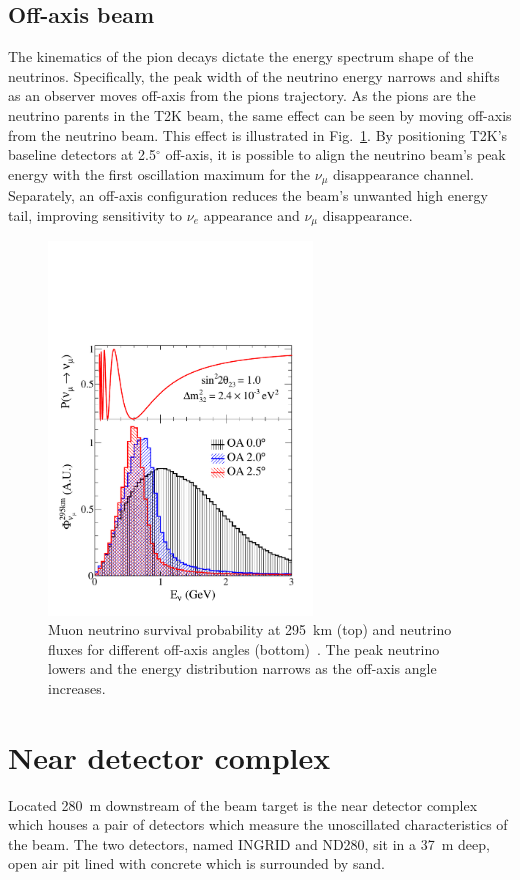 \subsection{Off-axis beam}
\label{subsec:OffAxisBeam}
The kinematics of the pion decays dictate the energy spectrum shape of the neutrinos.  Specifically, the peak width of the neutrino energy narrows and shifts as an observer moves off-axis from the pions trajectory.  As the pions are the neutrino parents in the T2K beam, the same effect can be seen by moving off-axis from the neutrino beam.  This effect is illustrated in Fig.~\ref{fig:OAEffectFlux}.  By positioning T2K's baseline detectors at 2.5$^\circ$ off-axis, it is possible to align the neutrino beam's peak energy with the first oscillation maximum for the $\nu_\mu$ disappearance channel.  Separately, an off-axis configuration reduces the beam's unwanted high energy tail, improving sensitivity to $\nu_e$ appearance and $\nu_\mu$ disappearance.
\begin{figure}
  \centering
  \includegraphics[width=7cm]{images/t2k/oaeffect_flux.pdf}
  \caption{Muon neutrino survival probability at 295~km (top) and neutrino fluxes for different off-axis angles (bottom)~\cite{PhysRevD.87.012001}.  The peak neutrino lowers and the energy distribution narrows as the off-axis angle increases.}
  \label{fig:OAEffectFlux}
\end{figure}



\section{Near detector complex}
\label{sec:NearDetectorComplex}
Located 280~m downstream of the beam target is the near detector complex which houses a pair of detectors which measure the unoscillated characteristics of the beam.  The two detectors, named INGRID and ND280, sit in a 37~m deep, open air pit lined with concrete which is surrounded by sand.


